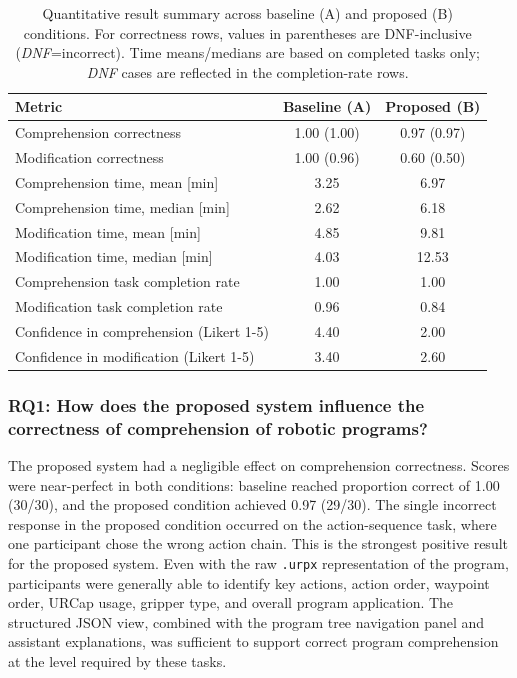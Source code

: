 \begin{table}[H]
    \centering
    \begin{tabular}{p{7cm}cc}
        \toprule
        \textbf{Metric}                          & \textbf{Baseline (A)} & \textbf{Proposed (B)} \\
        \midrule
        Comprehension correctness                & 1.00 (1.00)           & 0.97 (0.97)           \\
        Modification correctness                 & 1.00 (0.96)           & 0.60 (0.50)           \\
        Comprehension time, mean [min]           & 3.25                  & 6.97                  \\
        Comprehension time, median [min]         & 2.62                  & 6.18                  \\
        Modification time, mean [min]            & 4.85                  & 9.81                  \\
        Modification time, median [min]          & 4.03                  & 12.53                 \\
        Comprehension task completion rate       & 1.00                  & 1.00                  \\
        Modification task completion rate        & 0.96                  & 0.84                  \\
        Confidence in comprehension (Likert 1-5) & 4.40                  & 2.00                  \\
        Confidence in modification (Likert 1-5)  & 3.40                  & 2.60                  \\
        \bottomrule
    \end{tabular}
    \caption{Quantitative result summary across baseline (A) and proposed (B) conditions. For correctness rows, values in parentheses are DNF-inclusive (\textit{DNF}=incorrect). Time means/medians are based on completed tasks only; \textit{DNF} cases are reflected in the completion-rate rows.}
    \label{tab:evaluation:key-results}
\end{table}

\subsubsection*{RQ1: How does the proposed system influence the correctness of comprehension of robotic programs?}
The proposed system had a negligible effect on comprehension correctness. Scores were near-perfect in both conditions: baseline reached proportion correct of 1.00 (30/30), and the proposed condition achieved 0.97 (29/30). The single incorrect response in the proposed condition occurred on the action-sequence task, where one participant chose the wrong action chain. This is the strongest positive result for the proposed system. Even with the raw \texttt{.urpx} representation of the program, participants were generally able to identify key actions, action order, waypoint order, URCap usage, gripper type, and overall program application. The structured JSON view, combined with the program tree navigation panel and assistant explanations, was sufficient to support correct program comprehension at the level required by these tasks.

